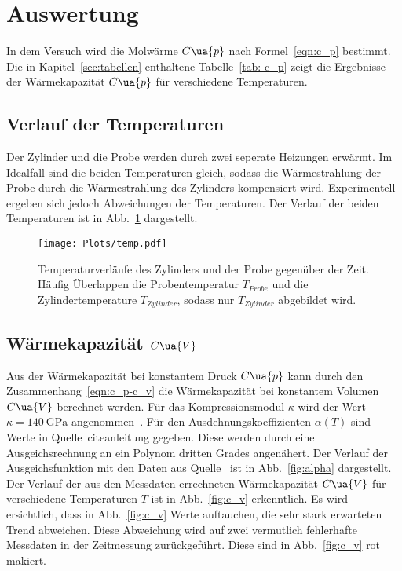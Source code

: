 \section{Auswertung}
\label{sec:auswertung}

In dem Versuch wird die Molwärme $C\ua{p}$ nach Formel~\eqref{eqn:c_p}
bestimmt. Die in Kapitel~\ref{sec:tabellen} enthaltene Tabelle~\ref{tab: c_p}
zeigt die Ergebnisse der Wärmekapazität $C\ua{p}$ für verschiedene Temperaturen.

\subsection{Verlauf der Temperaturen}

Der Zylinder und die Probe werden durch zwei seperate Heizungen erwärmt.
Im Idealfall sind die beiden Temperaturen gleich, sodass die Wärmestrahlung der
Probe durch die Wärmestrahlung des Zylinders kompensiert wird. Experimentell ergeben
sich jedoch Abweichungen der Temperaturen.
Der Verlauf der beiden Temperaturen ist in Abb.~\ref{fig:temp}
dargestellt.

\begin{figure}
  \centering
  \texttt{[image: Plots/temp.pdf]}
  \caption{Temperaturverläufe des Zylinders und der Probe gegenüber der Zeit.
  Häufig Überlappen die Probentemperatur $T_{Probe}$ und die Zylindertemperature $T_{Zylinder}$,
  sodass nur $T_{Zylinder}$ abgebildet wird.}
  \label{fig:temp}
\end{figure}


\subsection{Wärmekapazität $C\ua{V}$}

Aus der Wärmekapazität bei konstantem Druck $C\ua{p}$ kann
durch den Zusammenhang~\eqref{eqn:c_p-c_v} die Wärmekapazität bei
konstantem Volumen $C\ua{V}$ berechnet werden.
Für das Kompressionsmodul $\kappa$ wird der Wert $\kappa = \SI{140}{\giga\pascal}$
angenommen~\cite{kompression}.
Für den Ausdehnungskoeffizienten $\alpha(T)$ sind Werte in Quelle~cite{anleitung}
gegeben. Diese werden durch eine Ausgeichsrechnung an ein Polynom dritten Grades
angenähert. Der Verlauf der Ausgeichsfunktion mit den Daten aus Quelle~\cite{anleitung}
ist in Abb.~\ref{fig:alpha} dargestellt.
Der Verlauf der aus den Messdaten errechneten Wärmekapazität $C\ua{V}$
für verschiedene Temperaturen $T$ ist in Abb.~\ref{fig:c_v} erkenntlich.
Es wird ersichtlich, dass in Abb.~\ref{fig:c_v} Werte auftauchen, die sehr
stark erwarteten Trend abweichen.
Diese Abweichung wird auf zwei vermutlich fehlerhafte Messdaten in der Zeitmessung zurückgeführt.
Diese sind in Abb.~\ref{fig:c_v} rot makiert.

